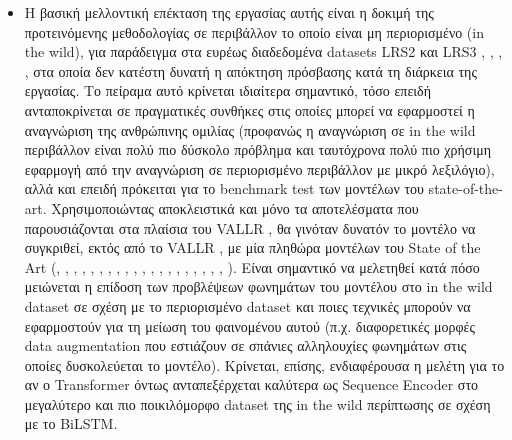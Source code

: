 \begin{itemize}

\item Η βασική μελλοντική επέκταση της εργασίας αυτής είναι η δοκιμή της προτεινόμενης μεθοδολογίας σε περιβάλλον το οποίο είναι μη περιορισμένο (in the wild), για παράδειγμα στα ευρέως διαδεδομένα datasets LRS2 και LRS3 \cite{Afouras18c}, \cite{Chung16}, \cite{Chung17}, \cite{Chung17a}, στα οποία δεν κατέστη δυνατή η απόκτηση πρόσβασης κατά τη διάρκεια της εργασίας. Το πείραμα αυτό κρίνεται ιδιαίτερα σημαντικό, τόσο επειδή ανταποκρίνεται σε πραγματικές συνθήκες στις οποίες μπορεί να εφαρμοστεί η αναγνώριση της ανθρώπινης ομιλίας (προφανώς η αναγνώριση σε in the wild περιβάλλον είναι πολύ πιο δύσκολο πρόβλημα και ταυτόχρονα πολύ πιο χρήσιμη εφαρμογή από την αναγνώριση σε περιορισμένο περιβάλλον με μικρό λεξιλόγιο), αλλά και επειδή πρόκειται για το benchmark test των μοντέλων του state-of-the-art. Χρησιμοποιώντας αποκλειστικά και μόνο τα αποτελέσματα που παρουσιάζονται στα πλαίσια του VALLR \cite{thomas2026vallrvisualasrlanguage}, θα γινόταν δυνατόν το μοντέλο να συγκριθεί, εκτός από το VALLR \cite{thomas2026vallrvisualasrlanguage}, με μία πληθώρα μοντέλων του State of the Art (\cite{afouras2020asrneedcrossmodaldistillation}, \cite{9009091}, \cite{xu2020discriminativemultimodalityspeechrecognition}, \cite{petridis2018endtoendaudiovisualspeechrecognition}, \cite{prajwal2021subwordlevellipreading}, \cite{Afouras_2022}, \cite{shillingford2018largescalevisualspeechrecognition}, \cite{makino2019recurrentneuralnetworktransducer}, \cite{serdyuk2022transformerbasedvideofrontendsaudiovisual}, \cite{chang2023conformersneedvisualspeech}, \cite{ma2021liralearningvisualspeech}, \cite{laux2023litevsrefficientvisualspeech}, \cite{Zhang_2024_CVPR}, \cite{shi2022learningaudiovisualspeechrepresentation}, \cite{djilali2023lip2vecefficientrobustvisual}, \cite{liu2023synthvsrscalingvisualspeech}, \cite{prajwal24_interspeech}, \cite{Ma_2023}, \cite{cappellazzo2025largelanguagemodelsstrong}, \cite{haliassos2023jointlylearningvisualauditory}, \cite{haliassos2024unifiedspeechrecognitionsingle}). Είναι σημαντικό να μελετηθεί κατά πόσο μειώνεται η επίδοση των προβλέψεων φωνημάτων του μοντέλου στο in the wild dataset σε σχέση με το περιορισμένο dataset και ποιες τεχνικές μπορούν να εφαρμοστούν για τη μείωση του φαινομένου αυτού (π.χ. διαφορετικές μορφές data augmentation που εστιάζουν σε σπάνιες αλληλουχίες φωνημάτων στις οποίες δυσκολεύεται το μοντέλο). Κρίνεται, επίσης, ενδιαφέρουσα η μελέτη για το αν ο Transformer όντως ανταπεξέρχεται καλύτερα ως Sequence Encoder στο μεγαλύτερο και πιο ποικιλόμορφο dataset της in the wild περίπτωσης σε σχέση με το BiLSTM.


\end{itemize}
